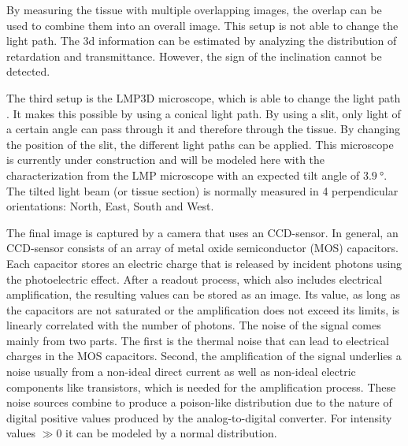 By measuring the tissue with multiple overlapping images, the overlap can be used to combine them into an overall image.
This setup is not able to change the light path.
The 3d information can be estimated by analyzing the distribution of retardation and transmittance.
However, the sign of the inclination cannot be detected.
\par
% 
The third setup is the \ac{LMP3D}  microscope, which is able to change the light path \cite{Wiese:887678}.
It makes this possible by using a conical light path.
By using a slit, only light of a certain angle can pass through it and therefore through the tissue.
By changing the position of the slit, the different light paths can be applied.
This microscope is currently under construction and will be modeled here with the characterization from the \ac{LMP} microscope with an expected tilt angle of $\SI{3.9}{\degree}$.
The tilted light beam (or tissue section) is normally measured in 4 perpendicular orientations: North, East, South and West.
\par
%
The final image is captured by a camera that uses an \ac{CCD}-sensor.
In general, an \ac{CCD}-sensor consists of an array of metal oxide semiconductor (MOS) capacitors.
Each capacitor stores an electric charge that is released by incident photons using the photoelectric effect.
After a readout process, which also includes electrical amplification, the resulting values can be stored as an image.
Its value, as long as the capacitors are not saturated or the amplification does not exceed its limits, is linearly correlated with the number of photons.
The noise of the signal comes mainly from two parts.
The first is the thermal noise that can lead to electrical charges in the MOS capacitors.
Second, the amplification of the signal underlies a noise usually from a non-ideal direct current as well as non-ideal electric components like transistors, which is needed for the amplification process.
These noise sources combine to produce a poison-like distribution due to the nature of digital positive values produced by the analog-to-digital converter.
For intensity values $\gg 0$ it can be modeled by a normal distribution.
%
%
%
